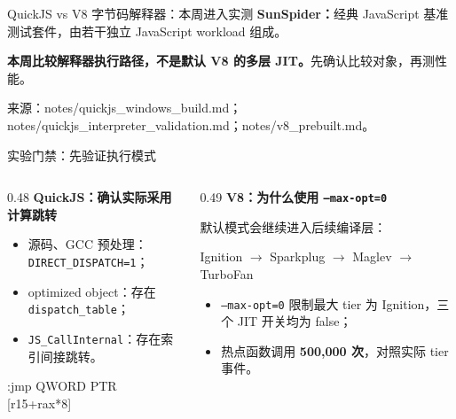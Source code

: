 \documentclass[aspectratio=169,10pt]{beamer}
\newcommand{\sourcenote}[1]{%
  {\color{NoteGray}\fontsize{6.7}{8}\selectfont #1}%
}
\newcommand{\code}[1]{\texttt{#1}}
\newcommand{\accent}[1]{\textcolor{DeepBlue}{\textbf{#1}}}
\begin{document}
\begin{frame}{QuickJS vs V8 字节码解释器：本周进入实测}
\vspace{0.06cm}
\textbf{SunSpider：}经典 JavaScript 基准测试套件，由若干独立 JavaScript workload 组成。

\vfill
\accent{本周比较解释器执行路径，不是默认 V8 的多层 JIT。}\quad 先确认比较对象，再测性能。

\vspace{0.04cm}
\sourcenote{来源：notes/quickjs\_windows\_build.md；notes/quickjs\_interpreter\_validation.md；notes/v8\_prebuilt.md。}
\end{frame}

\begin{frame}{实验门禁：先验证执行模式}
\fontsize{8.5}{9.8}\selectfont

\begin{columns}[T,onlytextwidth]
\begin{column}{0.48\textwidth}
  \textbf{QuickJS：确认实际采用计算跳转}
  \begin{itemize}\setlength{\itemsep}{0.02em}\setlength{\parskip}{0pt}
    \item 源码、GCC 预处理：\code{DIRECT\_DISPATCH=1}；
    \item optimized object：存在 \code{dispatch\_table}；
    \item \code{JS\_CallInternal}：存在索引间接跳转。
  \end{itemize}
  \vspace{-0.02cm}
  \colorbox{SoftBlue}{%
    \parbox{0.91\linewidth}{%
      \vspace{0.05cm}\ttfamily\fontsize{8.5}{9.8}:\quad jmp QWORD PTR [r15+rax*8]
      \vspace{0.05cm}%
    }%
  }
\end{column}

\begin{column}{0.49\textwidth}
  \textbf{V8：为什么使用 \code{--max-opt=0}}

  默认模式会继续进入后续编译层：
  \begin{center}
    \vspace{-0.07cm}
    \textcolor{DeepBlue}{Ignition $\rightarrow$ Sparkplug $\rightarrow$ Maglev $\rightarrow$ TurboFan}
    \vspace{-0.07cm}
  \end{center}
  \begin{itemize}\setlength{\itemsep}{0.02em}\setlength{\parskip}{0pt}
    \item \code{--max-opt=0} 限制最大 tier 为 Ignition，三个 JIT 开关均为 false；
    \item 热点函数调用 \accent{500,000 次}，对照实际 tier 事件。
  \end{itemize}
\end{column}
\end{columns}


\end{frame}
\end{document}
